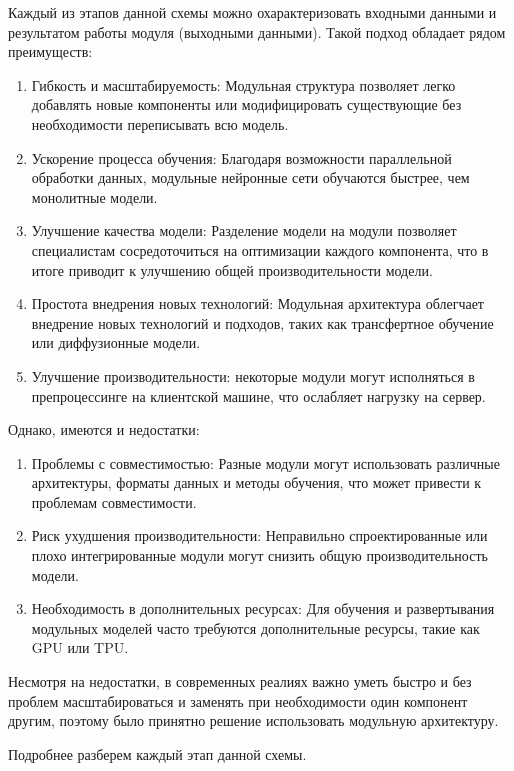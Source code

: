 Каждый из этапов данной схемы можно охарактеризовать входными данными и результатом работы модуля (выходными данными).
Такой подход обладает рядом преимуществ:
\begin{enumerate}
    \item Гибкость и масштабируемость: Модульная структура позволяет легко добавлять новые компоненты или модифицировать существующие без необходимости переписывать всю модель.
    \item Ускорение процесса обучения: Благодаря возможности параллельной обработки данных, модульные нейронные сети обучаются быстрее, чем монолитные модели.
    \item Улучшение качества модели: Разделение модели на модули позволяет специалистам сосредоточиться на оптимизации каждого компонента, что в итоге приводит к улучшению общей производительности модели.
    \item Простота внедрения новых технологий: Модульная архитектура облегчает внедрение новых технологий и подходов, таких как трансфертное обучение или диффузионные модели.
    \item Улучшение производительности: некоторые модули могут исполняться в препроцессинге на клиентской машине, что ослабляет нагрузку на сервер.
\end{enumerate}
Однако, имеются и недостатки:
\begin{enumerate}
    \item Проблемы с совместимостью: Разные модули могут использовать различные архитектуры, форматы данных и методы обучения, что может привести к проблемам совместимости.
    \item Риск ухудшения производительности: Неправильно спроектированные или плохо интегрированные модули могут снизить общую производительность модели.
    \item Необходимость в дополнительных ресурсах: Для обучения и развертывания модульных моделей часто требуются дополнительные ресурсы, такие как GPU или TPU.
\end{enumerate}

Несмотря на недостатки, в современных реалиях важно уметь быстро и без проблем масштабироваться и заменять при необходимости один компонент другим, поэтому было принятно решение использовать модульную архитектуру.

Подробнее разберем каждый этап данной схемы.